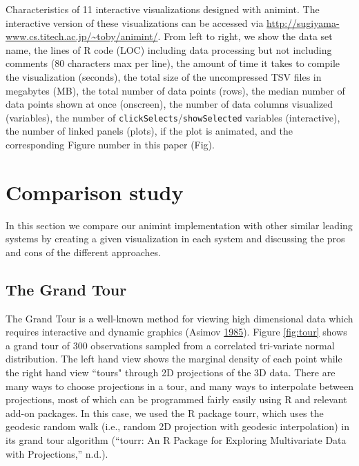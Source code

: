 \documentclass[12pt,]{isuthesis}
\begin{document}
\begin{table}[htp] %
  \centering
  \hspace*{-2cm}
  
  \vskip 0.2cm
  \caption{Characteristics of 11 interactive visualizations designed with
    animint. The interactive version of these visualizations can be accessed 
    via \url{http://sugiyama-www.cs.titech.ac.jp/\~toby/animint/}.
    From left to right, we show the data set name, the
    lines of R code (LOC) including data processing but not including comments
    (80 characters max per line),
    the amount of time it takes to compile the visualization (seconds),
    the total size of the uncompressed TSV files in megabytes (MB),
    the total number of data points (rows),
    the median number of data points shown at once (onscreen),
    the number of data columns visualized (variables),
    the number of \texttt{clickSelects}/\texttt{showSelected} 
    variables (interactive),
    the number of linked panels (plots),
    if the plot is animated,
    and the corresponding Figure number in this paper (Fig).
  }
\label{tab:examples}
\end{table}

\section{Comparison study}
\label{sec:compare}

In this section we compare our animint implementation with other similar
leading systems by creating a given visualization in each system and
discussing the pros and cons of the different approaches.

\subsection{The Grand Tour}
\label{sec:tour}

The Grand Tour is a well-known method for viewing high dimensional data
which requires interactive and dynamic graphics (Asimov
\protect\hyperlink{ref-grand-tour}{1985}). Figure \ref{fig:tour} shows a
grand tour of 300 observations sampled from a correlated tri-variate
normal distribution. The left hand view shows the marginal density of
each point while the right hand view ``tours" through 2D projections of
the 3D data. There are many ways to choose projections in a tour, and
many ways to interpolate between projections, most of which can be
programmed fairly easily using R and relevant add-on packages. In this
case, we used the R package tourr, which uses the geodesic random walk
(i.e., random 2D projection with geodesic interpolation) in its grand
tour algorithm (``tourr: An R Package for Exploring Multivariate Data
with Projections,'' n.d.).
\end{document}
